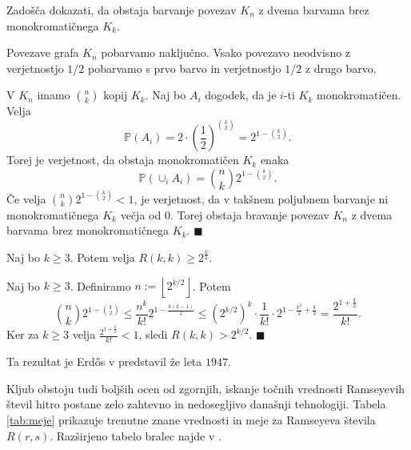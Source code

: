 \documentclass[twoside,11pt]{article}
\providecommand{\floor}[1]{\left\lfloor #1\right\rfloor}
\begin{document}
\begin{dokaz}
    Zadošča dokazati, da obstaja barvanje povezav $K_n$ z dvema barvama
    brez monokromatičnega $K_k$.

    Povezave grafa $K_n$ pobarvamo naključno. Vsako povezavo 
    neodvisno z verjetnostjo $1/2$ pobarvamo s prvo barvo in 
    verjetnostjo $1/2$ z drugo barvo.
    
    V $K_n$ imamo $\binom{n}{k}$ kopij $K_k$. Naj bo $A_i$ dogodek, da 
    je $i$-ti $K_k$ monokromatičen. Velja
    \[
        \mathbb{P}(A_i) = 2 \cdot \left(\frac{1}{2}\right)^{\binom{k}{2}} = 
        2^{1-\binom{k}{2}}.
    \]
    Torej je verjetnost, da obstaja monokromatičen $K_k$ enaka 
    \[
        \mathbb{P}\left(\cup_iA_i\right) = \binom{n}{k}2^{1-\binom{k}{2}}.
    \]
    Če velja $\binom{n}{k}2^{1-\binom{k}{2}} < 1$, je verjetnost, da v 
    takšnem poljubnem barvanje ni monokromatičnega $K_k$ večja od $0$.
    Torej obstaja bravanje povezav $K_n$ z dvema barvama brez 
    monokromatičnega $K_k$. \hfill $\blacksquare$
\end{dokaz}

\begin{posledica}
    Naj bo $k \ge 3$. Potem velja $R(k, k) \ge 2^\frac{k}{2}$.
\end{posledica}

\begin{dokaz}
    Naj bo $k \ge 3$. Definiramo $n:=\floor{2^{k/2}}$. Potem
    \[
        \binom{n}{k}2^{1-\binom{k}{2}} \le
        \frac{n^k}{k!}2^{1-\frac{k(k-1)}{2}} \le 
        \left(2^{k/2}\right)^k \cdot \frac{1}{k!} \cdot 2^{1-\frac{k^2}{2}+\frac{k}{2}} =
        \frac{2^{1+\frac{k}{2}}}{k!}.
    \]
    Ker za $k \ge 3$ velja $\frac{2^{1+\frac{k}{2}}}{k!} < 1$, sledi $R(k, k) > 2^{k/2}$. \hfill $\blacksquare$
\end{dokaz}

Ta rezultat je Erdős v \cite{erdos} predstavil že leta $1947$.


Kljub obstoju tudi boljših ocen od zgornjih, %
iskanje točnih vrednosti Ramseyevih števil hitro postane zelo zahtevno in 
nedosegljivo današnji tehnologiji. Tabela \ref{tab:meje} prikazuje 
trenutne znane vrednosti in meje za Ramseyeva števila $R(r, s)$. 
Razširjeno tabelo bralec najde v \cite{wiki}.
\end{document}
